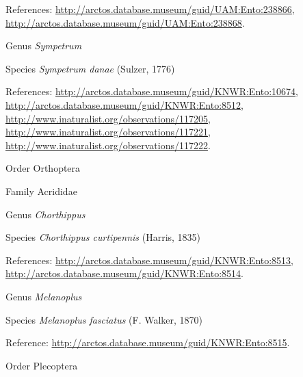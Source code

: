 \documentclass[9pt, article]{memoir}
\begin{document}
\begin{multicols}{2}
\vspace{6pt}References: 
\url{http://arctos.database.museum/guid/UAM:Ento:238866}, 
\url{http://arctos.database.museum/guid/UAM:Ento:238868}.

\vspace{6pt}\noindent\hspace{30pt}Genus \textit{Sympetrum}


\vspace{6pt}\noindent\hspace{36pt}Species \textit{Sympetrum danae} (Sulzer, 1776)


\vspace{6pt}References: 
\url{http://arctos.database.museum/guid/KNWR:Ento:10674}, 
\url{http://arctos.database.museum/guid/KNWR:Ento:8512}, 
\url{http://www.inaturalist.org/observations/117205}, 
\url{http://www.inaturalist.org/observations/117221}, 
\url{http://www.inaturalist.org/observations/117222}.

\vspace{6pt}\noindent\hspace{18pt}Order Orthoptera


\vspace{6pt}\noindent\hspace{24pt}Family Acrididae


\vspace{6pt}\noindent\hspace{30pt}Genus \textit{Chorthippus}


\vspace{6pt}\noindent\hspace{36pt}Species \textit{Chorthippus curtipennis} (Harris, 1835)


\vspace{6pt}References: 
\url{http://arctos.database.museum/guid/KNWR:Ento:8513}, 
\url{http://arctos.database.museum/guid/KNWR:Ento:8514}.

\vspace{6pt}\noindent\hspace{30pt}Genus \textit{Melanoplus}


\vspace{6pt}\noindent\hspace{36pt}Species \textit{Melanoplus fasciatus} (F. Walker, 1870)


\vspace{6pt}Reference: 
\url{http://arctos.database.museum/guid/KNWR:Ento:8515}.

\vspace{6pt}\noindent\hspace{18pt}Order Plecoptera



\end{multicols}
\end{document}

